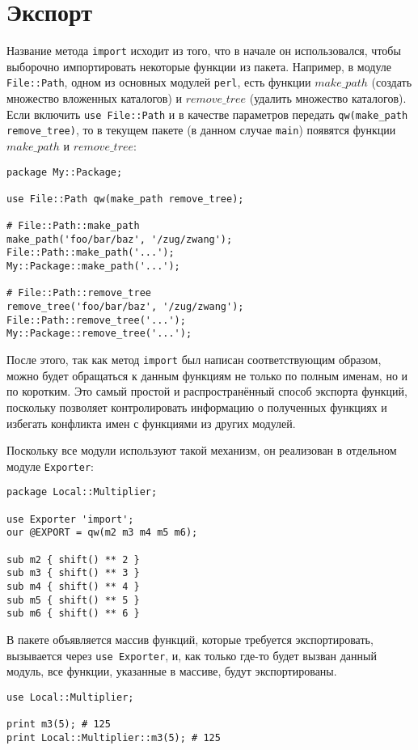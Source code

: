 \section{Экспорт} %
Название метода \verb|import| исходит из того, что в начале он использовался, чтобы выборочно импортировать некоторые функции из пакета. Например, в модуле \verb|File::Path|, одном из основных модулей \verb|perl|, есть функции $make\_path$ (создать множество вложенных каталогов) и $remove\_tree$ (удалить множество каталогов). Если включить \verb|use File::Path| и в качестве параметров передать \verb|qw(make_path remove_tree)|, то в текущем пакете (в данном случае \verb|main|) появятся функции $make\_path$ и $remove\_tree$:
\begin{verbatim}
package My::Package;

use File::Path qw(make_path remove_tree);

# File::Path::make_path
make_path('foo/bar/baz', '/zug/zwang');
File::Path::make_path('...');
My::Package::make_path('...');

# File::Path::remove_tree
remove_tree('foo/bar/baz', '/zug/zwang');
File::Path::remove_tree('...');
My::Package::remove_tree('...');
\end{verbatim}
После этого, так как метод \verb|import| был написан соответствующим образом, можно будет обращаться к данным функциям не только по полным именам, но и по коротким. Это самый простой и распространённый способ экспорта функций, поскольку позволяет контролировать информацию о полученных функциях и избегать конфликта имен с функциями из других модулей.

Поскольку все модули используют такой механизм, он реализован в отдельном модуле \verb|Exporter|:
\begin{verbatim}
package Local::Multiplier;

use Exporter 'import';
our @EXPORT = qw(m2 m3 m4 m5 m6);

sub m2 { shift() ** 2 }
sub m3 { shift() ** 3 }
sub m4 { shift() ** 4 }
sub m5 { shift() ** 5 }
sub m6 { shift() ** 6 }
\end{verbatim}
В пакете объявляется массив функций, которые требуется экспортировать, вызывается через \verb|use Exporter|, и, как только где-то будет вызван данный модуль, все функции, указанные в массиве, будут экспортированы.
\begin{verbatim}
use Local::Multiplier;

print m3(5); # 125
print Local::Multiplier::m3(5); # 125
\end{verbatim}

